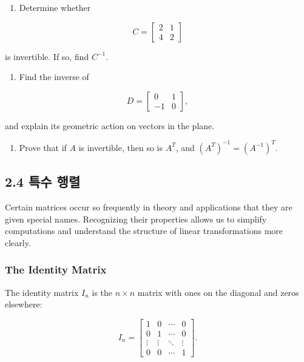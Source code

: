 \documentclass[
  12pt,
  a4paper,
]{article}
\begin{document}
\begin{enumerate}
\def\labelenumi{\arabic{enumi}.}
\item
  Determine whether
\end{enumerate}

\[C = \begin{bmatrix} 2 & 1 \\ 4 & 2 \end{bmatrix}\]

is invertible. If so, find \(C^{-1}\).

\begin{enumerate}
\def\labelenumi{\arabic{enumi}.}
\item
  Find the inverse of
\end{enumerate}

\[D = \begin{bmatrix} 0 & 1 \\ -1 & 0 \end{bmatrix},\]

and explain its geometric action on vectors in the plane.

\begin{enumerate}
\def\labelenumi{\arabic{enumi}.}
\item
  Prove that if \(A\) is invertible, then so is \(A^T\), and
  \((A^T)^{-1} = (A^{-1})^T\).
\end{enumerate}

\subsection{2.4 특수 행렬}\label{24-special-matrices}

Certain matrices occur so frequently in theory and applications that
they are given special names. Recognizing their properties allows us to
simplify computations and understand the structure of linear
transformations more clearly.

\subsubsection{The Identity Matrix}\label{the-identity-matrix}

The identity matrix \(I_n\) is the \(n \times n\) matrix with ones on
the diagonal and zeros elsewhere:

\[I_n = \begin{bmatrix}
1 & 0 & \cdots & 0 \\
0 & 1 & \cdots & 0 \\
\vdots & \vdots & \ddots & \vdots \\
0 & 0 & \cdots & 1
\end{bmatrix}.\]
\end{document}

